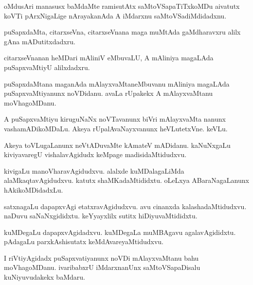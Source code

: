 \documentclass{article}
\begin{document}
\begin{mn}%
oMdusAri manasusx baMdaMte ramisutAtx saMtoVSapaTiTxkoMDu aivatutx koVTi pArxNigaLige nArayakanAda 
A iMdarxnu saMtoVSadiMdidadxnu.
\end{mn}

\begin{mn}%
puSapxdaMta, citarxseVna, citarxseVnana maga muMtAda gaMdharavxru alilx gAna mADutitxdadxru.
\end{mn}

\begin{mn}%
citarxseVnanan heMDari mAliniV eMbuvaLU, A mAliniya magaLAda puSapxvaMtiyU alilxdadxru.
\end{mn}

\begin{mn}%
puSapxdaMtana maganAda mAlayxvaMtaneMbuvanu mAliniya magaLAda puSapxvaMtiyanunx noVDidanu. avaLa 
rUpakekx A mAlayxvaMtanu moVhagoMDanu.
\end{mn}

\begin{mn}%
A puSapxvaMtiyu kiruguNaNx noVTavanunx biVri mAlayxvaMta nanunx vashamADikoMDaLu. Akeya 
rUpalAvaNayxvanunx heVLutetxVne. keVLu.
\end{mn}

\begin{mn}%
Akeya toVLugaLanunx neVtADuvaMte kAmateV mADidanu. kaNuNxgaLu kiviyavaregU vishalavAgidudx keMpage 
madisidaMtidudxvu.
\end{mn}

\begin{mn}%
kivigaLu manoVharavAgidudxvu. alalxde kuMDalagaLiMda alaMkaqtavAgidudxvu. katutx shaMKadaMtididxtu. 
oLeLxya ABaraNagaLanunx hAkikoMDidadxLu.
\end{mn}

\begin{mn}%
satxnagaLu dapapxvAgi etatxravAgidudxvu. avu cinanxda kalashadaMtidudxvu. naDuvu saNaNxgididxtu. 
keYyayxlilx sutitx hiDiyuvaMtididxtu.
\end{mn}

\begin{mn}%
kuMDegaLu dapapxvAgidadxvu. kuMDegaLa muMBAgavu agalavAgididxtu. pAdagaLu parxkAshisutatx 
keMdAvareyaMtidudxvu.
\end{mn}

\begin{mn}%
I riVtiyAgidadx puSapxvatiyanunx noVDi mAlayxvaMtanu bahu moVhagoMDanu. ivaribabxrU iMdarxnanUnx 
saMtoVSapaDisalu kuNiyuvudakekx baMdaru.
\end{mn}
\end{document}
